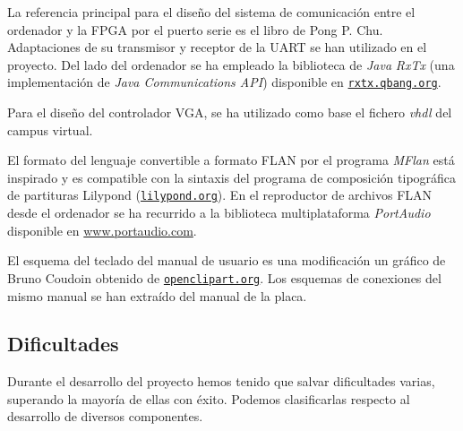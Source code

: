 \documentclass{article}
\begin{document}
	\medskip La referencia principal para el diseño del sistema de comunicación entre el ordenador y la FPGA por el puerto serie es el libro \cite{PCHU} de Pong P. Chu. Adaptaciones de su transmisor y receptor de la UART se han utilizado en el proyecto. Del lado del ordenador se ha empleado la biblioteca de {\itshape Java} {\itshape RxTx} (una implementación de {\itshape Java Communications API}) disponible en \href{http://rxtx.qbang.org}{\nolinkurl{rxtx.qbang.org}}.

	\medskip Para el diseño del controlador VGA, se ha utilizado como base el fichero {\itshape vhdl} del campus virtual.

	\medskip El formato del lenguaje convertible a formato FLAN por el programa {\itshape MFlan} está inspirado y es compatible con la sintaxis del programa de composición tipográfica de partituras Lilypond (\href{http://lilypond.org}{\nolinkurl{lilypond.org}}). En el reproductor de archivos FLAN desde el ordenador se ha recurrido a la biblioteca multiplataforma {\itshape PortAudio} disponible en \url{www.portaudio.com}.

	\medskip El esquema del teclado del manual de usuario es una modificación un gráfico de Bruno Coudoin obtenido de \href{http://openclipart.org}{\nolinkurl{openclipart.org}}. Los esquemas de conexiones del mismo manual se han extraído del manual de la placa.

\subsection{Dificultades}
	Durante el desarrollo del proyecto hemos tenido que salvar dificultades varias, superando la mayoría de ellas con éxito. Podemos clasificarlas respecto al desarrollo de diversos componentes.
\end{document}
